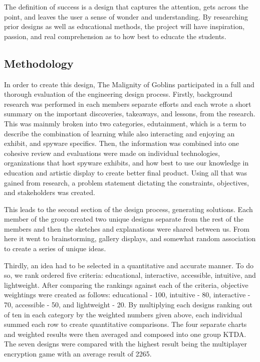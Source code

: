 \documentclass[conference]{IEEEtran}
\begin{document}
The definition of success is a design that captures the attention, gets across the point, and leaves the user a sense of wonder and understanding. By researching prior designs as well as educational methods, the project will have inspiration, passion, and real comprehension as to how best to educate the students. 

\subsection{Methodology}


\par In order to create this design, The Malignity of Goblins participated in a full and thorough evaluation of the engineering design process. Firstly, background research was performed in each members separate efforts and each wrote a short summary on the important discoveries, takeaways, and lessons, from the research. This was mainmly broken into two categories, edutainment, which is a term to describe the combination of learning while also interacting and enjoying an exhibit, and spyware specifics. Then, the information was combined into one cohesive review and evaluations were made on individual technologies, organizations that host spyware exhibits, and how best to use our knowledge in education and artistic display to create better final product. Using all that was gained from research, a problem statement dictating the constraints, objectives, and stakeholders was created.
\par This leads to the second section of the design process, generating solutions. Each member of the group created two unique designs separate from the rest of the members and then the sketches and explanations were shared between us. From here it went to brainstorming, gallery displays, and somewhat random association to create a series of unique ideas.
\par Thirdly, an idea had to be selected in a quantitative and accurate manner. To do so, we rank ordered five criteria: educational, interactive, accessible, intuitive, and lightweight. After comparing the rankings against each of the criteria, objective weightings were created as follows: educational - 100, intuitive - 80, interactive - 70, accessible - 50, and lightweight - 20. By multiplying each designs ranking out of ten in each category by the weighted numbers given above, each individual summed each row to create quantitative comparisons. The four separate charts and weighted results were then averaged and composed into one group KTDA. The seven designs were compared with the highest result being the multiplayer encryption game with an average result of 2265.
\end{document}
